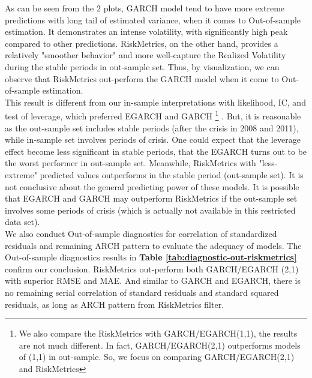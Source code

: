 \documentclass[a4paper]{article}
\begin{document}
As can be seen from the 2 plots, GARCH model tend to have more extreme predictions with long tail of estimated variance, when it comes to Out-of-sample estimation. It demonstrates an intense volatility, with significantly high peak compared to other predictions. RiskMetrics, on the other hand, provides a relatively "smoother behavior" and more well-capture the Realized Volatility during the stable periods in out-sample set. Thus, by visualization, we can observe that RiskMetrics out-perform the GARCH model when it come to Out-of-sample estimation.\\ 

This result is different from our in-sample interpretations with likelihood, IC, and test of leverage, which preferred EGARCH and GARCH \footnote{We also compare the RiskMetrics with GARCH/EGARCH(1,1), the results are not much different. In fact, GARCH/EGARCH(2,1) outperforms models of (1,1) in out-sample. So, we focus on comparing GARCH/EGARCH(2,1) and RiskMetrics} . But, it is reasonable as the out-sample set includes stable periods (after the crisis in 2008 and 2011), while in-sample set involves periods of crisis. One could expect that the leverage effect become less significant in stable periods, that the EGARCH turns out to be the worst performer in out-sample set. Meanwhile, RiskMetrics with "less-extreme" predicted values outperforms in the stable period (out-sample set). It is not conclusive about the general predicting power of these models. It is possible that EGARCH and GARCH may outperform RiskMetrics if the out-sample set involves some periods of crisis (which is actually not available in this restricted data set).\\

We also conduct Out-of-sample diagnostics for correlation of standardized residuals and remaining ARCH pattern to evaluate the adequacy of models. 
The Out-of-sample diagnostics results in \textbf{Table \ref{tab:diagnostic-out-riskmetrics}} confirm our conclusion. RiskMetrics out-perform both GARCH/EGARCH (2,1) with superior RMSE and MAE. And similar to GARCH and EGARCH, there is no remaining serial correlation of standard residuals and standard squared residuals, as long as ARCH pattern from RiskMetrics filter.
\end{document}
